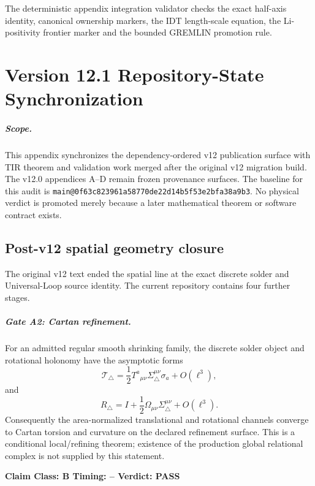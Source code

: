\documentclass[11pt,a4paper,twoside]{book}
\def\({}%
\def\){}%
\theoremstyle{definition}
\newcommand{\vTwelveStatus}[3]{\par\noindent\textbf{Claim Class: #1 \quad Timing: #2 \quad Verdict: #3}\par}
\begin{document}
The deterministic appendix integration validator checks the exact half-axis
identity, canonical \(\kappa\) ownership markers, the IDT length-scale equation,
the Li-positivity frontier marker and the bounded GREMLIN promotion rule.

\clearpage





\chapter{Version 12.1 Repository-State Synchronization}
\label{app:v12_1_repository_sync}

\paragraph{Scope.}
This appendix synchronizes the dependency-ordered v12 publication surface with
TIR theorem and validation work merged after the original v12 migration build.
The v12.0 appendices A--D remain frozen provenance surfaces.  The baseline for
this audit is \texttt{main@0f63c823961a58770de22d14b5f53e2bfa38a9b3}.
No physical verdict is promoted merely because a later mathematical theorem or
software contract exists.

\section{Post-v12 spatial geometry closure}

The original v12 text ended the spatial line at the exact discrete solder and
Universal-Loop source identity.  The current repository contains four further
stages.

\paragraph{Gate A2: Cartan refinement.}
For an admitted regular smooth shrinking family, the discrete solder object and
rotational holonomy have the asymptotic forms
\[
\mathcal T_{\triangle}
=\frac12 T^a{}_{\mu\nu}\Sigma^{\mu\nu}_{\triangle}\sigma_a
+O(\ell^3),
\]
and
\[
R_{\triangle}
=I+\frac12\Omega_{\mu\nu}\Sigma^{\mu\nu}_{\triangle}
+O(\ell^3).
\]
Consequently the area-normalized translational and rotational channels converge
to Cartan torsion and curvature on the declared refinement surface.  This is a
conditional local/refining theorem; existence of the production global
relational complex is not supplied by this statement.
\vTwelveStatus{B}{--}{PASS}
\end{document}
